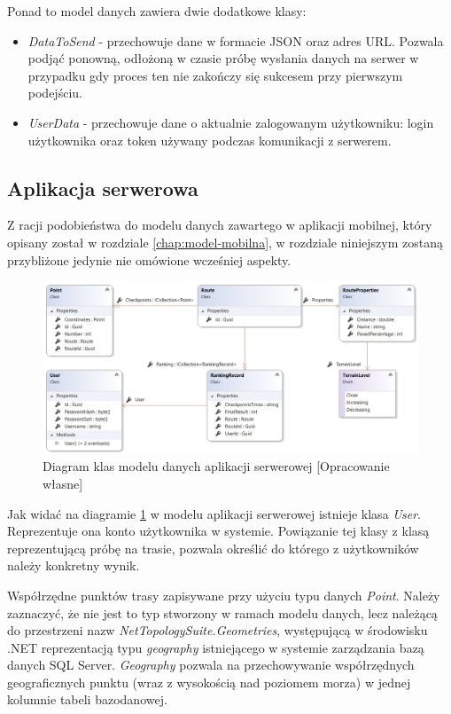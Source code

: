 Ponad to model danych zawiera dwie dodatkowe klasy:
\begin{itemize}
\item{\textit{DataToSend}} - przechowuje dane w formacie JSON oraz adres URL. Pozwala podjąć ponowną, odłożoną w czasie próbę wysłania danych na serwer w przypadku gdy proces ten nie zakończy się sukcesem przy pierwszym podejściu.
\item{\textit{UserData}} - przechowuje dane o aktualnie zalogowanym użytkowniku: login użytkownika oraz token używany podczas komunikacji z serwerem.
\end{itemize}
\subsection{Aplikacja serwerowa}
Z racji podobieństwa do modelu danych zawartego w aplikacji mobilnej, który opisany został w rozdziale \ref{chap:model-mobilna}, w rozdziale niniejszym zostaną przybliżone jedynie nie omówione wcześniej aspekty. 

\begin{figure}[h]\label{fig:api_model}
\begin{center}
\includegraphics[width=\textwidth]{img/api_model.png}
\caption{Diagram klas modelu danych aplikacji serwerowej [Opracowanie własne]}\label{image:api_model}
\end{center}
\end{figure}

Jak widać na diagramie \ref{image:api_model} w modelu aplikacji serwerowej istnieje klasa \textit{User}. Reprezentuje ona konto użytkownika w systemie. Powiązanie tej klasy z klasą reprezentującą próbę na trasie, pozwala określić do którego z użytkowników należy konkretny wynik.

Współrzędne punktów trasy zapisywane przy użyciu typu danych \textit{Point}. Należy zaznaczyć, że nie jest to typ stworzony w ramach modelu danych, lecz należącą do przestrzeni nazw \textit{NetTopologySuite.Geometries}, występującą w środowisku .NET reprezentacją typu \textit{geography} istniejącego w systemie zarządzania bazą danych SQL Server. \textit{Geography} pozwala na przechowywanie współrzędnych geograficznych punktu (wraz z wysokością nad poziomem morza) w jednej kolumnie tabeli bazodanowej. \cite{geography-type}

